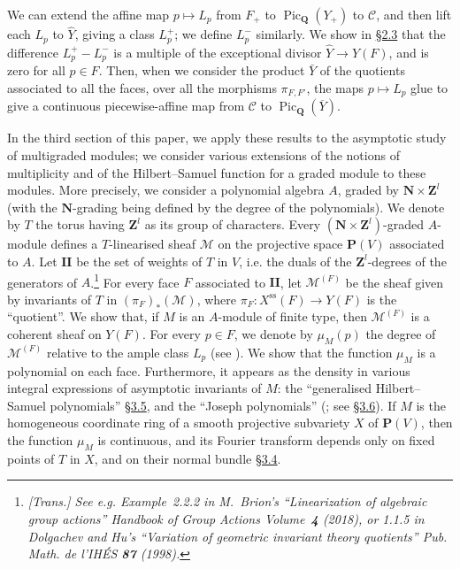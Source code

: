 \documentclass{article}
\newcommand{\scr}[1]{{\mathscr{#1}}}
\newcommand{\PP}{\mathbf{P}}
\newcommand{\QQ}{\mathbf{Q}}
\newcommand{\NN}{\mathbf{N}}
\newcommand{\ZZ}{\mathbf{Z}}
\renewcommand{\ss}{\mathrm{ss}}
\newcommand{\II}{\mathbf{II}}
\DeclareMathOperator{\Pic}{Pic}
\newcommand{\oldpage}[1]{\marginpar{\footnotesize$\Big\vert$ \textit{p.~#1}}}
\begin{document}
We can extend the affine map $p\mapsto L_p$ from $F_+$ to $\Pic_\QQ(Y_+)$ to $\mathcal{C}$, and then lift each $L_p$ to $\hat{Y}$, giving a class $L_p^+$;
we define $L_p^-$ similarly.
We show in \hyperref[2.3]{\S2.3} that the difference $L_p^+ - L_p^-$ is a multiple of the exceptional divisor $\hat{Y}\to Y(F)$, and is zero for all $p\in F$.
Then, when we consider the product $\bar{Y}$ of the quotients associated to all the faces, over all the morphisms $\pi_{F,F'}$, the maps $p\mapsto L_p$ glue to give a continuous piecewise-affine map from $\mathcal{C}$ to $\Pic_\QQ(\overline{Y})$.

In the third section of this paper, we apply these results to the asymptotic study of multigraded modules;
we consider various extensions of the notions of multiplicity and of the Hilbert--Samuel function for a graded module to these modules.
More precisely, we consider a polynomial algebra $A$, graded by $\NN\times\ZZ^l$ (with the $\NN$-grading being defined by the degree of the polynomials).
We denote by $T$ the torus having $\ZZ^l$ as its group of characters.
Every $(\NN\times\ZZ^l)$-graded $A$-module defines
\oldpage{511}
a $T$-linearised sheaf $\scr{M}$ on the projective space $\PP(V)$ associated to $A$.
Let $\II$ be the set of weights of $T$ in $V$, i.e. the duals of the $\ZZ^l$-degrees of the generators of $A$.\footnote{\emph{[Trans.] See e.g. Example~2.2.2 in M.~Brion's ``Linearization of algebraic group actions'' \emph{Handbook of Group Actions} Volume~\textbf{4} (2018), or 1.1.5 in Dolgachev and Hu's ``Variation of geometric invariant theory quotients'' \emph{Pub. Math. de l'IH\'{E}S} \textbf{87} (1998).}}
For every face $F$ associated to $\II$, let $\scr{M}^{(F)}$ be the sheaf given by invariants of $T$ in $(\pi_F)_*(\scr{M})$, where $\pi_F\colon X^\ss(F)\to Y(F)$ is the ``quotient''.
We show that, if $M$ is an $A$-module of finite type, then $\scr{M}^{(F)}$ is a coherent sheaf on $Y(F)$.
For every $p\in F$, we denote by $\mu_M(p)$ the degree of $\scr{M}^{(F)}$ relative to the ample class $L_p$ (see \cite[I.3]{Kle}).
We show that the function $\mu_M$ is a polynomial on each face.
Furthermore, it appears as the density in various integral expressions of asymptotic invariants of $M$: the ``generalised Hilbert--Samuel polynomials'' \hyperref[3.5]{\S3.5}, and the ``Joseph polynomials'' (\cite{Jos}; see \hyperref[3.6]{\S3.6}).
If $M$ is the homogeneous coordinate ring of a smooth projective subvariety $X$ of $\PP(V)$, then the function $\mu_M$ is continuous, and its Fourier transform depends only on fixed points of $T$ in $X$, and on their normal bundle \hyperref[3.4]{\S3.4}.
\end{document}
